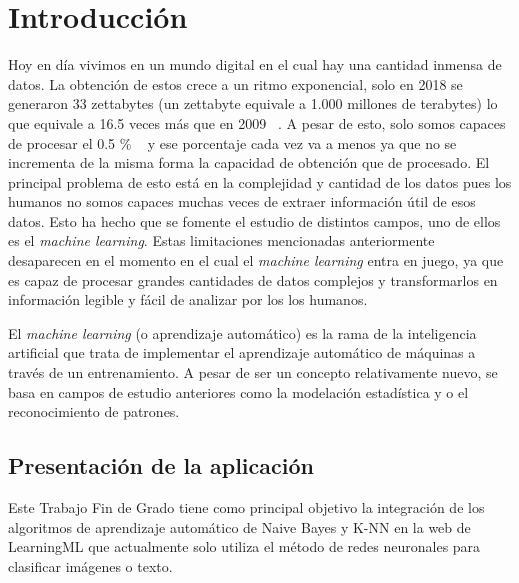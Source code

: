 \documentclass[a4paper, 12pt]{book}
\begin{document}

\cleardoublepage
\chapter{Introducción}
\label{sec:intro} %

Hoy en día vivimos en un mundo digital en el cual hay una cantidad inmensa de datos. La obtención de estos crece a un ritmo exponencial, solo en 2018 se generaron 33 zettabytes (un zettabyte equivale a 1.000 millones de terabytes) lo que equivale a 16.5 veces más que en 2009 ~\cite{webstatista}. A pesar de esto, solo somos capaces de procesar el 0.5 \% ~\cite{machinelearning} y ese porcentaje cada vez va a menos ya que no se incrementa de la misma forma la capacidad de obtención que de procesado. El principal problema de esto está en la complejidad y cantidad de los datos pues los humanos no somos capaces muchas veces de extraer información útil de esos datos. Esto ha hecho que se fomente el estudio de distintos campos, uno de ellos es el \emph{machine learning}. Estas limitaciones mencionadas anteriormente desaparecen en el momento en el cual el \emph{machine learning} entra en juego, ya que es capaz de procesar grandes cantidades de datos complejos y transformarlos en información legible y fácil de analizar por los los humanos.

El \emph{machine learning} (o aprendizaje automático) es la rama de la inteligencia artificial que trata de implementar el aprendizaje automático de máquinas a través de un entrenamiento. A pesar de ser un concepto relativamente nuevo, se basa en campos de estudio anteriores como la modelación estadística y o el reconocimiento de patrones.

\section{Presentación de la aplicación}
\label{sec:presentacionaplicacion}

Este Trabajo Fin de Grado tiene como principal objetivo la integración de los algoritmos de aprendizaje automático de Naive Bayes y K-NN en la web de LearningML que actualmente solo utiliza el método de redes neuronales para clasificar imágenes o texto.
\end{document}
